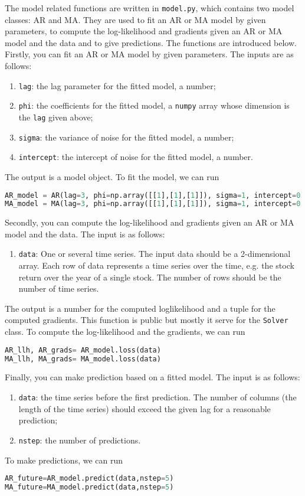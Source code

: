 The model related functions are written in \texttt{model.py}, which contains two model classes: AR and MA. They are used to fit an AR or MA model by given parameters, to compute the log-likelihood and gradients given an AR or MA model and the data and to give predictions. The functions are introduced below.
Firstly, you can fit an AR or MA model by given parameters. The inputs are as follows: 
\begin{enumerate}
\item \texttt{lag}: the lag parameter for the fitted model, a number;
\item \texttt{phi}: the coefficients for the fitted model, a \texttt{numpy} array whose dimension is the \texttt{lag} given above;
\item \texttt{sigma}: the variance of noise for the fitted model, a number;
\item \texttt{intercept}: the intercept of noise for the fitted model, a number.
\end{enumerate}
The output is a model object.
To fit the model, we can run
\begin{lstlisting}[language=Python]
AR_model = AR(lag=3, phi=np.array([[1],[1],[1]]), sigma=1, intercept=0.1)
MA_model = MA(lag=3, phi=np.array([[1],[1],[1]]), sigma=1, intercept=0.1)
\end{lstlisting}
Secondly, you can compute the log-likelihood and gradients given an AR or MA model and the data. The input is as follows:
\begin{enumerate}
\item \texttt{data}: One or several time series. The input data should be a 2-dimensional array. Each row of data represents a time series over the time, e.g. the stock return over the year of a single stock. The number of rows should be the number of time series.
\end{enumerate}
The output is a number for the computed loglikelihood and a tuple for the computed gradients. This function is public but mostly it serve for the \texttt{Solver} class. 
To compute the log-likelihood and the gradients, we can run 
\begin{lstlisting}[language=Python]
AR_llh, AR_grads= AR_model.loss(data)
MA_llh, MA_grads= MA_model.loss(data)
\end{lstlisting}
Finally, you can make prediction based on a fitted model. The input is as follows:
\begin{enumerate}
\item \texttt{data}: the time series before the first prediction. The number of columns (the length of the time series) should exceed the given lag for a reasonable prediction;
\item \texttt{nstep}: the number of predictions.
\end{enumerate}
To make predictions, we can run
\begin{lstlisting}[language=Python]
AR_future=AR_model.predict(data,nstep=5)
MA_future=MA_model.predict(data,nstep=5)
\end{lstlisting}



